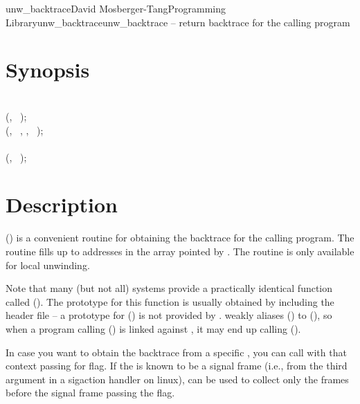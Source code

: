 \documentclass{article}
\begin{document}
\begin{Name}{3}{unw\_backtrace}{David Mosberger-Tang}{Programming Library}{unw\_backtrace}unw\_backtrace -- return backtrace for the calling program
\end{Name}

\section{Synopsis}

\\

 (, ~);\\
 (, ~, , ~);\\

\\

 (, ~);\\

\section{Description}

() is a convenient routine for obtaining the backtrace for
the calling program. The routine fills up to  addresses in the array
pointed by . The routine is only available for local unwinding.

Note that many (but not all) systems provide a practically identical function
called (). The prototype for this function is usually obtained
by including the  header file -- a prototype for
() is not provided by .  weakly
aliases () to (), so when a program
calling () is linked against , it may end up
calling ().

In case you want to obtain the backtrace from a specific ,
you can call  with that context passing  for flag. 
If the  is known to be a signal frame (i.e., from the third argument
in a sigaction handler on linux),  can be used to collect
only the frames before the signal frame passing the  flag.
\end{document}
